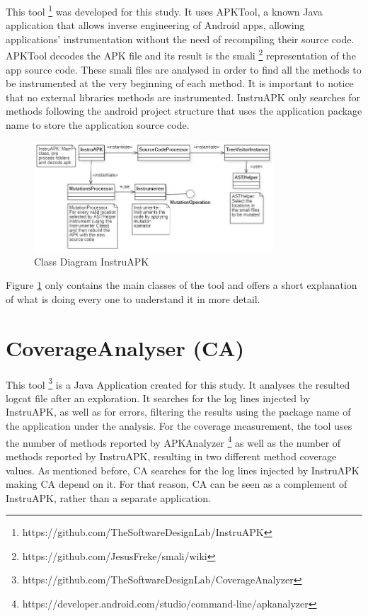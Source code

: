 This tool \footnote{https://github.com/TheSoftwareDesignLab/InstruAPK} was developed for this study. It uses APKTool, a known Java application that allows inverse engineering of Android apps, allowing applications' instrumentation without the need of recompiling their source code. APKTool decodes the APK file and its result is the smali \footnote{https://github.com/JesusFreke/smali/wiki} representation of the app source code. These smali files are analysed in order to find all the methods to be instrumented at the very beginning of each method. It is important to notice that no external libraries methods are instrumented. InstruAPK only searches for methods following the android project structure that uses the application package name to store the application source code.

\begin{figure}[h]
\centering
\includegraphics[width=0.8\textwidth]{../Figures/ClassDiagramInstruAPK.jpg}
\caption{Class Diagram InstruAPK}\label{fig:instruAPK}
\end{figure}

Figure \ref{fig:instruAPK} only contains the main classes of the tool and offers a short explanation of what is doing every one to understand it in more detail.

\section{CoverageAnalyser (CA)}\label{sec:ca}

This tool \footnote{https://github.com/TheSoftwareDesignLab/CoverageAnalyzer} is a Java Application created for this study. It analyses the resulted logcat file after an exploration. It searches for the log lines injected by InstruAPK, as well as for errors, filtering the results using the package name of the application under the analysis. For the coverage measurement, the tool uses the number of methods reported by APKAnalyzer \footnote{https://developer.android.com/studio/command-line/apkanalyzer} as well as the number of methods reported by InstruAPK, resulting in two different method coverage values. As mentioned before, CA searches for the log lines injected by InstruAPK making CA depend on it. For that reason, CA can be seen as a complement of InstruAPK, rather than a separate application.

